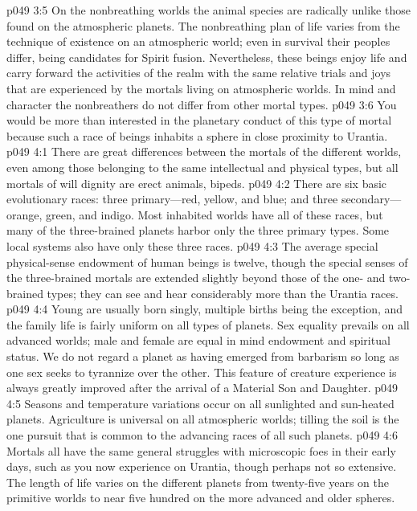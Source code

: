 \vs p049 3:5 On the nonbreathing worlds the animal species are radically unlike those found on the atmospheric planets. The nonbreathing plan of life varies from the technique of existence on an atmospheric world; even in survival their peoples differ, being candidates for Spirit fusion. Nevertheless, these beings enjoy life and carry forward the activities of the realm with the same relative trials and joys that are experienced by the mortals living on atmospheric worlds. In mind and character the nonbreathers do not differ from other mortal types.
\vs p049 3:6 You would be more than interested in the planetary conduct of this type of mortal because such a race of beings inhabits a sphere in close proximity to Urantia.
\vs p049 4:1 There are great differences between the mortals of the different worlds, even among those belonging to the same intellectual and physical types, but all mortals of will dignity are erect animals, bipeds.
\vs p049 4:2 There are six basic evolutionary races: three primary---red, yellow, and blue; and three secondary---orange, green, and indigo. Most inhabited worlds have all of these races, but many of the three\hyp{}brained planets harbor only the three primary types. Some local systems also have only these three races.
\vs p049 4:3 The average special physical\hyp{}sense endowment of human beings is twelve, though the special senses of the three\hyp{}brained mortals are extended slightly beyond those of the one\hyp{} and two\hyp{}brained types; they can see and hear considerably more than the Urantia races.
\vs p049 4:4 Young are usually born singly, multiple births being the exception, and the family life is fairly uniform on all types of planets. Sex equality prevails on all advanced worlds; male and female are equal in mind endowment and spiritual status. We do not regard a planet as having emerged from barbarism so long as one sex seeks to tyrannize over the other. This feature of creature experience is always greatly improved after the arrival of a Material Son and Daughter.
\pc \vs p049 4:5 Seasons and temperature variations occur on all sunlighted and sun\hyp{}heated planets. Agriculture is universal on all atmospheric worlds; tilling the soil is the one pursuit that is common to the advancing races of all such planets.
\vs p049 4:6 Mortals all have the same general struggles with microscopic foes in their early days, such as you now experience on Urantia, though perhaps not so extensive. The length of life varies on the different planets from twenty\hyp{}five years on the primitive worlds to near five hundred on the more advanced and older spheres.

